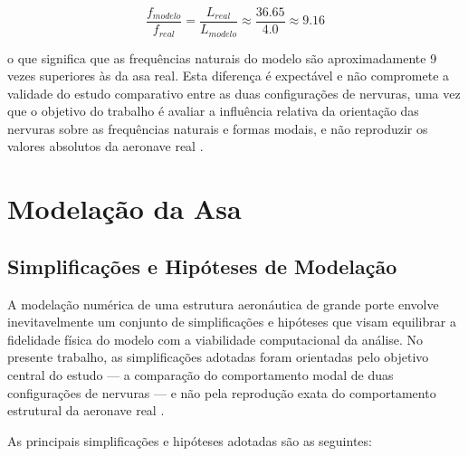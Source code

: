 \documentclass[a4paper,fleqn,noprintline]{cas-dc}
\begin{document}
\begin{equation}
    \frac{f_{modelo}}{f_{real}} = \frac{L_{real}}{L_{modelo}} 
    \approx \frac{36.65}{4.0} \approx 9.16
    \label{eq:escala_freq}
\end{equation}

\noindent o que significa que as frequências naturais do modelo são aproximadamente 9 vezes superiores às da asa real. Esta diferença é expectável e não compromete a validade do estudo comparativo entre as duas configurações de nervuras, uma vez que o objetivo do trabalho é avaliar a influência relativa da orientação das nervuras sobre as frequências naturais e formas modais, e não reproduzir os valores absolutos da aeronave real \cite{Dowell2004}.

\section{Modelação da Asa}
\label{chap:modelacao}

\subsection{Simplificações e Hipóteses de Modelação}

A modelação numérica de uma estrutura aeronáutica de grande porte envolve inevitavelmente um conjunto de simplificações e hipóteses que visam equilibrar a fidelidade física do modelo com a viabilidade computacional da análise. No presente trabalho, as simplificações adotadas foram orientadas pelo objetivo central do estudo --- a comparação do comportamento modal de duas configurações de nervuras --- e não pela reprodução exata do comportamento estrutural da aeronave real \cite{Dowell2004}.

As principais simplificações e hipóteses adotadas são as seguintes:
\end{document}
